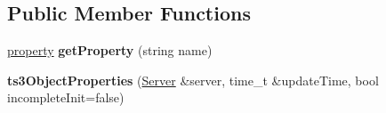 \subsection*{Public Member Functions}
\begin{DoxyCompactItemize}
\item 
\hyperlink{struct_ts3_api_1_1property}{property} {\bfseries get\+Property} (string name)\hypertarget{struct_ts3_api_1_1ts3_object_properties_ae3cb0a412b4fa5ac6dc2b26e6431da2e}{}\label{struct_ts3_api_1_1ts3_object_properties_ae3cb0a412b4fa5ac6dc2b26e6431da2e}

\item 
{\bfseries ts3\+Object\+Properties} (\hyperlink{class_ts3_api_1_1_server}{Server} \&server, time\+\_\+t \&update\+Time, bool incomplete\+Init=false)\hypertarget{struct_ts3_api_1_1ts3_object_properties_afdb9693f8d6ebad8376edab2f355842f}{}\label{struct_ts3_api_1_1ts3_object_properties_afdb9693f8d6ebad8376edab2f355842f}

\end{DoxyCompactItemize}
